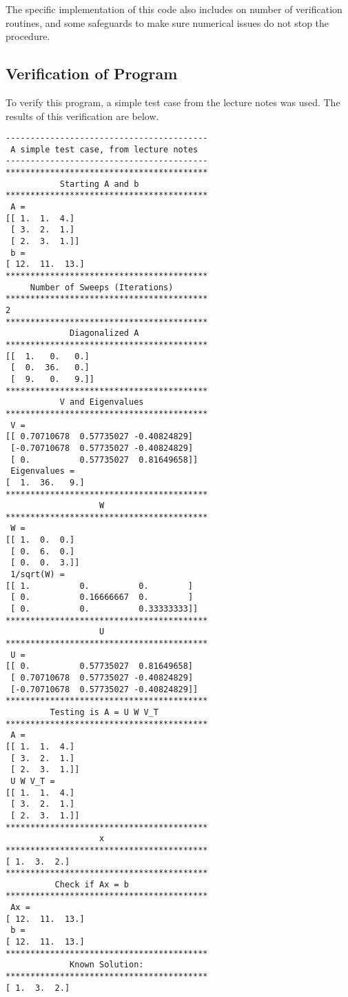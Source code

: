 \documentclass[10pt,letter]{article}
\begin{document}
The specific implementation of this code also includes on number of verification routines, and some safeguards to make sure numerical issues do not stop the procedure.

\subsection{Verification of Program}

To verify this program, a simple test case from the lecture notes was used. The results of this verification are below. 

\begin{verbatim}
-----------------------------------------
 A simple test case, from lecture notes  
-----------------------------------------
*****************************************
           Starting A and b              
*****************************************
 A = 
[[ 1.  1.  4.]
 [ 3.  2.  1.]
 [ 2.  3.  1.]]
 b = 
[ 12.  11.  13.]
*****************************************
     Number of Sweeps (Iterations)       
*****************************************
2
*****************************************
             Diagonalized A              
*****************************************
[[  1.   0.   0.]
 [  0.  36.   0.]
 [  9.   0.   9.]]
*****************************************
           V and Eigenvalues             
*****************************************
 V = 
[[ 0.70710678  0.57735027 -0.40824829]
 [-0.70710678  0.57735027 -0.40824829]
 [ 0.          0.57735027  0.81649658]]
 Eigenvalues = 
[  1.  36.   9.]
*****************************************
                   W                     
*****************************************
 W = 
[[ 1.  0.  0.]
 [ 0.  6.  0.]
 [ 0.  0.  3.]]
 1/sqrt(W) = 
[[ 1.          0.          0.        ]
 [ 0.          0.16666667  0.        ]
 [ 0.          0.          0.33333333]]
*****************************************
                   U                     
*****************************************
 U = 
[[ 0.          0.57735027  0.81649658]
 [ 0.70710678  0.57735027 -0.40824829]
 [-0.70710678  0.57735027 -0.40824829]]
*****************************************
         Testing is A = U W V_T          
*****************************************
 A = 
[[ 1.  1.  4.]
 [ 3.  2.  1.]
 [ 2.  3.  1.]]
 U W V_T = 
[[ 1.  1.  4.]
 [ 3.  2.  1.]
 [ 2.  3.  1.]]
*****************************************
                   x                     
*****************************************
[ 1.  3.  2.]
*****************************************
          Check if Ax = b                
*****************************************
 Ax = 
[ 12.  11.  13.]
 b = 
[ 12.  11.  13.]
*****************************************
             Known Solution:             
*****************************************
[ 1.  3.  2.]
\end{verbatim}
\end{document}
